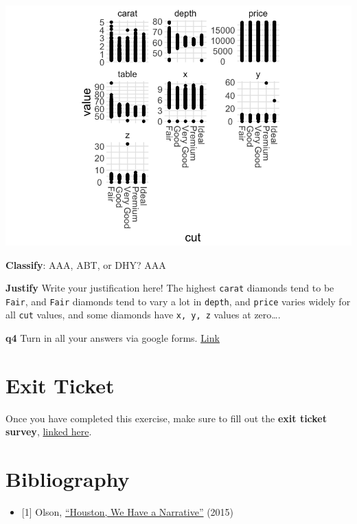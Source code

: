 \documentclass[
]{article}
\providecommand{\tightlist}{%
  \setlength{\itemsep}{0pt}\setlength{\parskip}{0pt}}
\begin{document}
\includegraphics{e-comm01-story-basics_files/figure-latex/q3-vis-1.png}

\textbf{Classify}: AAA, ABT, or DHY? AAA

\textbf{Justify} Write your justification here! The highest
\texttt{carat} diamonds tend to be \texttt{Fair}, and \texttt{Fair}
diamonds tend to vary a lot in \texttt{depth}, and \texttt{price} varies
widely for all \texttt{cut} values, and some diamonds have
\texttt{x,\ y,\ z} values at zero\ldots.

\newpage

\textbf{q4} Turn in all your answers via google forms.
\href{https://forms.gle/kHuT5oufUQA7jRWG8}{Link}

\hypertarget{exit-ticket}{%
\section{Exit Ticket}\label{exit-ticket}}

Once you have completed this exercise, make sure to fill out the
\textbf{exit ticket survey},
\href{https://docs.google.com/forms/d/e/1FAIpQLSeuq2LFIwWcm05e8-JU84A3irdEL7JkXhMq5Xtoalib36LFHw/viewform?usp=pp_url\&entry.693978880=e-comm01-story-basics.Rmd}{linked
here}.

\hypertarget{bibliography}{%
\section{Bibliography}\label{bibliography}}

\begin{itemize}
\tightlist
\item
  {[}1{]} Olson, \href{http://scienceneedsstory.com/}{``Houston, We Have
  a Narrative''} (2015)
\end{itemize}
\end{document}
